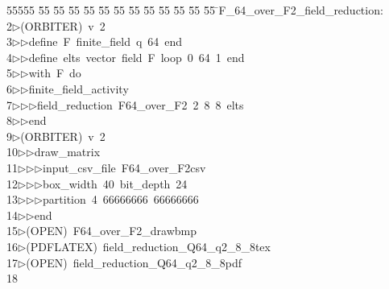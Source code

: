 %
%
\begin{tabbing}
55555 \= 55 \= 55 \= 55 \= 55 \= 55 \= 55 \= 55 \= 55 \= 55 \= 55 \= 55 \= 55 \= \>F\_64\_over\_F2\_field\_reduction:\\[0pt]
2\>$\triangleright$\>(ORBITER)\ v\ 2\ \\[0pt]
3\>$\triangleright$\>$\triangleright$\>define\ F\ finite\_field\ q\ 64\ end\ \\[0pt]
4\>$\triangleright$\>$\triangleright$\>define\ elts\ vector\ field\ F\ loop\ 0\ 64\ 1\ end\ \\[0pt]
5\>$\triangleright$\>$\triangleright$\>with\ F\ do\ \\[0pt]
6\>$\triangleright$\>$\triangleright$\>finite\_field\_activity\ \\[0pt]
7\>$\triangleright$\>$\triangleright$\>$\triangleright$\>field\_reduction\ F64\_over\_F2\ 2\ 8\ 8\ elts\ \\[0pt]
8\>$\triangleright$\>$\triangleright$\>end\\[0pt]
9\>$\triangleright$\>(ORBITER)\ v\ 2\ \\[0pt]
10\>$\triangleright$\>$\triangleright$\>draw\_matrix\ \\[0pt]
11\>$\triangleright$\>$\triangleright$\>$\triangleright$\>input\_csv\_file\ F64\_over\_F2csv\ \\[0pt]
12\>$\triangleright$\>$\triangleright$\>$\triangleright$\>box\_width\ 40\ bit\_depth\ 24\ \\[0pt]
13\>$\triangleright$\>$\triangleright$\>$\triangleright$\>partition\ 4\ 66666666\ 66666666\ \\[0pt]
14\>$\triangleright$\>$\triangleright$\>end\\[0pt]
15\>$\triangleright$\>(OPEN)\ F64\_over\_F2\_drawbmp\\[0pt]
16\>$\triangleright$\>(PDFLATEX)\ field\_reduction\_Q64\_q2\_8\_8tex\\[0pt]
17\>$\triangleright$\>(OPEN)\ field\_reduction\_Q64\_q2\_8\_8pdf\\[0pt]
18\>\end{tabbing}
